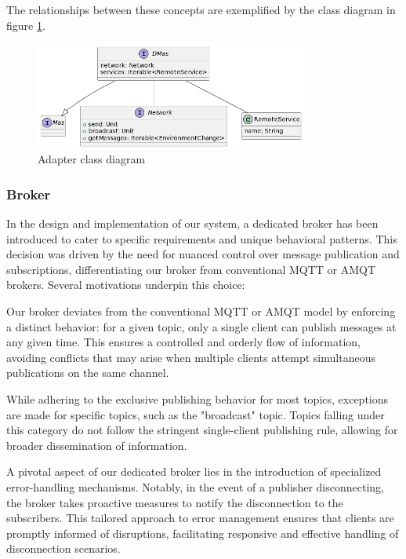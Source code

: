 The relationships between these concepts are exemplified by the class diagram in figure \ref{fig:class-dmas}.

\begin{figure}[ht!]
    \centering
    \includegraphics[width=0.8\textwidth]{figures/class-dmas.png}
    \caption{Adapter class diagram}
    \label{fig:class-dmas}
\end{figure}

\subsubsection{Broker}

In the design and implementation of our system, a dedicated broker has been introduced to cater to specific requirements and unique behavioral patterns. This decision was driven by the need for nuanced control over message publication and subscriptions, differentiating our broker from conventional MQTT or AMQT brokers. Several motivations underpin this choice:

Our broker deviates from the conventional MQTT or AMQT model by enforcing a distinct behavior: for a given topic, only a single client can publish messages at any given time. This ensures a controlled and orderly flow of information, avoiding conflicts that may arise when multiple clients attempt simultaneous publications on the same channel.

While adhering to the exclusive publishing behavior for most topics, exceptions are made for specific topics, such as the "broadcast" topic. Topics falling under this category do not follow the stringent single-client publishing rule, allowing for broader dissemination of information.

A pivotal aspect of our dedicated broker lies in the introduction of specialized error-handling mechanisms. Notably, in the event of a publisher disconnecting, the broker takes proactive measures to notify the disconnection to the subscribers. This tailored approach to error management ensures that clients are promptly informed of disruptions, facilitating responsive and effective handling of disconnection scenarios.

